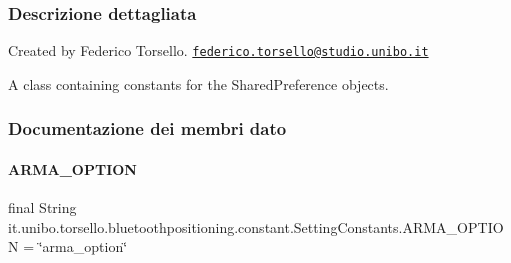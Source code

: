 \subsubsection{Descrizione dettagliata}
Created by Federico Torsello. \href{mailto:federico.torsello@studio.unibo.it}{\tt federico.\+torsello@studio.\+unibo.\+it} 

A class containing constants for the Shared\+Preference objects. 

\subsubsection{Documentazione dei membri dato}
\hypertarget{classit_1_1unibo_1_1torsello_1_1bluetoothpositioning_1_1constant_1_1SettingConstants_ad8f1f7986a4558736769604d606f53a1_ad8f1f7986a4558736769604d606f53a1}{}\label{classit_1_1unibo_1_1torsello_1_1bluetoothpositioning_1_1constant_1_1SettingConstants_ad8f1f7986a4558736769604d606f53a1_ad8f1f7986a4558736769604d606f53a1} 
\paragraph{\texorpdfstring{A\+R\+M\+A\+\_\+\+O\+P\+T\+I\+ON}{ARMA\_OPTION}}
{\footnotesize\ttfamily final String it.\+unibo.\+torsello.\+bluetoothpositioning.\+constant.\+Setting\+Constants.\+A\+R\+M\+A\+\_\+\+O\+P\+T\+I\+ON = \char`\"{}arma\+\_\+option\char`\"{}\hspace{0.3cm}{\ttfamily [static]}}

\hypertarget{classit_1_1unibo_1_1torsello_1_1bluetoothpositioning_1_1constant_1_1SettingConstants_a2c0b004552568f9813696b26b89b840c_a2c0b004552568f9813696b26b89b840c}{}\label{classit_1_1unibo_1_1torsello_1_1bluetoothpositioning_1_1constant_1_1SettingConstants_a2c0b004552568f9813696b26b89b840c_a2c0b004552568f9813696b26b89b840c} 

